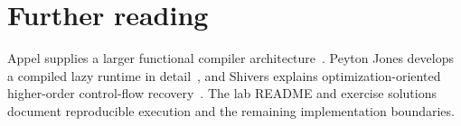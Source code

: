 \section{Further reading}
\label{sec:ch93-reading}
Appel supplies a larger functional compiler architecture~\cite{appel-1998-modern}.
Peyton Jones develops a compiled lazy runtime in detail~\cite{peytonjones-1992-stg}, and Shivers explains optimization-oriented higher-order control-flow recovery~\cite{shivers-1991-control}.
The lab README and exercise solutions document reproducible execution and the remaining implementation boundaries.

